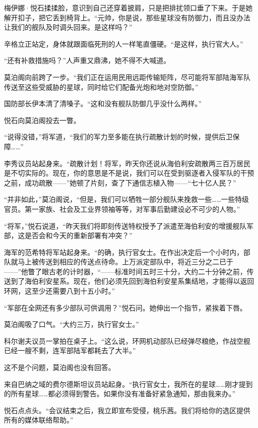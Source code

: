 \documentclass[AutoFakeBold=true]{book}
\begin{document}
梅伊娜·悦石揉揉脸，意识到自己还穿着披肩，只是把排扰领口垂了下来。于是她解开扣子，把它丢到椅背上。``元帅，你是说，那些星球没有防御力，而且没办法让我们的舰队及时调头回来。是这样吗？''

辛格立正站定，身体就跟面临死刑的人一样笔直僵硬。``是这样，执行官大人。''

``还有{\kaishu 补救}措施吗？''人声重又鼎沸，她不得不大喊道。

莫泊阁向前跨了一步。``我们正在运用民用远距传输矩阵，尽可能将军部陆海军队传送至这些受威胁的星球，同时给它们配备光炮和地对空防御。''

国防部长伊本清了清嗓子。``这和没有舰队防御几乎没什么两样。''

悦石向莫泊阁投去一瞥。

``说得没错，''将军道，``我们的军力至多能在执行疏散计划的时候，提供后卫保障……''

李秀议员站起身来。``疏散计划！将军，昨天你还说从海伯利安疏散两三百万居民是不切实际的。现在，你的意思是不是说，我们可以在受到驱逐者入侵军队的干预之前，成功疏散——''她顿了片刻，查了下通信志植入物——``{\kaishu 七十亿人民}？''

``并非如此，''莫泊阁说，``但是，我们可以牺牲一部分舰队来挽救一些……一些特级官员。第一家族、社会及工业界领袖等等，对军事后勤建设必不可少的人物。''

``将军，''悦石说道，``昨天我们将即刻传送特权授予了派遣至海伯利安的增援舰队军部，这是否会和今天的重新部署有冲突？''

海军的范希特将军站起身来。``的确，执行官女士。在作出决定后一个小时内，部队就马上被传送到相应的传送点待命。上万派定部队中，将近三分之二已于——''他瞥了眼古老的计时器，``——标准时间五时三十分，大约二十分钟之前，传送到了海伯利安星系。现在，他们必须先回到海伯利安星系集结地，才能得以返回环网，这至少还需要八到十五小时。''

``军部在全网还有多少部队可供调用？''悦石问。她伸出一个指节，紧挨着下唇。

莫泊阁吸了口气。``大约三万，执行官女士。''

科尔谢夫议员一掌拍在桌子上。``这么说，环网机动部队已经弹尽粮绝，作战空舰已经一艘不剩，连军部陆军都耗去了大半。''

这不是个问题，莫泊阁也没有回答。

来自巴纳之域的费尔德斯坦议员站起身。``执行官女士，我所在的星球……刚才提到的所有星球……都必须得到警告。如果你没有准备好紧急通知，那由我来办。''

悦石点点头。``会议结束之后，我立即宣布受侵，桃乐茜。我们将给你的选区提供所有的媒体联络帮助。''
\end{document}
